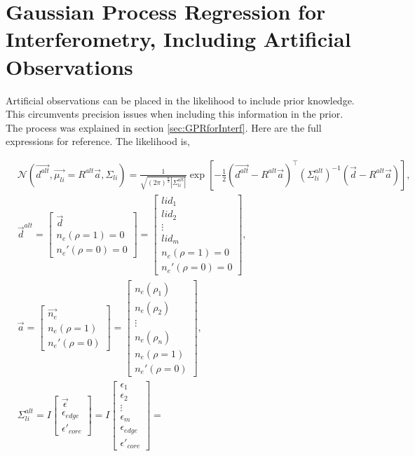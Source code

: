 \section{Gaussian Process Regression for Interferometry, Including Artificial Observations}

Artificial observations can be placed in the likelihood to include prior knowledge. This circumvents precision issues when including this information in the prior. The process was explained in section \ref{sec:GPRforInterf}. Here are the full expressions for reference. The likelihood is,

\begin{equation}
\begin{aligned}
&\mathcal{N}(\vec{d^{alt}}, \vec{\mu_{li}} = R^{alt}\vec{a}, \Sigma_{li}) = \frac{1}{\sqrt{(2\pi)^{\frac{n}{2}}|\Sigma_{li}^{alt}|}} \exp \left[{{-\frac{1}{2}(\vec{d^{alt}}-R^{alt}\vec{a})^\top(\Sigma_{li}^{alt})^{-1}(\vec{d}-R^{alt}\vec{a})}}\right],\\
&\vec d^{alt} = \begin{bmatrix} \vec{d}\\ n_e(\rho=1)=0\\ n_e'(\rho=0)=0 \end{bmatrix} = \begin{bmatrix} lid_1\\ lid_2 \\ \vdots \\ lid_m \\ n_e(\rho=1)=0\\ n_e'(\rho=0)=0 \end{bmatrix}, \\
&\vec a = \begin{bmatrix} \vec{n_e}\\ n_e(\rho=1)\\ n_e'(\rho=0) \end{bmatrix} = \begin{bmatrix} n_e(\rho_1)\\ n_e(\rho_2) \\ \vdots \\ n_e(\rho_n) \\ n_e(\rho=1)\\ n_e'(\rho=0) \end{bmatrix}, \\
&\Sigma_{li}^{alt} = I\begin{bmatrix}\vec{\epsilon} \\ \epsilon_{edge} \\ \epsilon'_{core}\end{bmatrix} = I\begin{bmatrix}\epsilon_1 \\ \epsilon_2 \\ \vdots \\ \epsilon_m \\ \epsilon_{edge} \\ \epsilon'_{core}\end{bmatrix} =

\end{aligned}
\end{equation}
